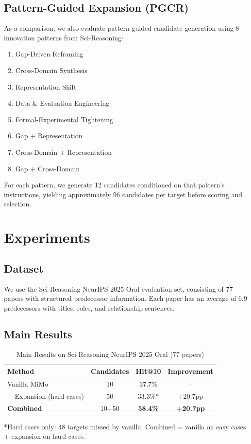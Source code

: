 \documentclass[conference]{IEEEtran}
\begin{document}
\subsection{Pattern-Guided Expansion (PGCR)}

As a comparison, we also evaluate pattern-guided candidate generation using 8 innovation patterns from Sci-Reasoning:
\begin{enumerate}
    \item Gap-Driven Reframing
    \item Cross-Domain Synthesis
    \item Representation Shift
    \item Data \& Evaluation Engineering
    \item Formal-Experimental Tightening
    \item Gap + Representation
    \item Cross-Domain + Representation
    \item Gap + Cross-Domain
\end{enumerate}

For each pattern, we generate 12 candidates conditioned on that pattern's instructions, yielding approximately 96 candidates per target before scoring and selection.

\section{Experiments}

\subsection{Dataset}

We use the Sci-Reasoning NeurIPS 2025 Oral evaluation set, consisting of 77 papers with structured predecessor information. Each paper has an average of 6.9 predecessors with titles, roles, and relationship sentences.

\subsection{Main Results}

\begin{table}[htbp]
\caption{Main Results on Sci-Reasoning NeurIPS 2025 Oral (77 papers)}
\label{tab:main}
\begin{center}
\begin{tabular}{lccc}
\toprule
Method & Candidates & Hit@10 & Improvement \\
\midrule
Vanilla MiMo & 10 & 37.7\% & -- \\
+ Expansion (hard cases) & 50 & 33.3\%* & +20.7pp \\
\textbf{Combined} & 10+50 & \textbf{58.4\%} & \textbf{+20.7pp} \\
\bottomrule
\end{tabular}
\end{center}
\footnotesize{*Hard cases only: 48 targets missed by vanilla. Combined = vanilla on easy cases + expansion on hard cases.}
\end{table}
\end{document}
